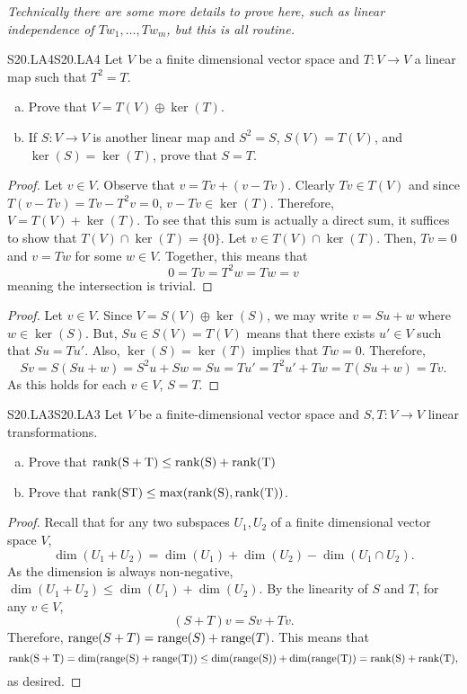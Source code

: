 \documentclass[../AlgebraQualSolutions.tex]{subfiles}
\begin{document}
	\emph{Technically there are some more details to prove here, such as linear independence of $Tw_1,\ldots, Tw_m$, but this is all routine.}

	\begin{prob}{S20.LA4}{S20.LA4}
		Let $V$ be a finite dimensional vector space and $T: V \to V$ a linear map such that $T^2 = T$.
		\begin{enumerate}[(a)]
			\item Prove that $V = T(V) \oplus \ker(T)$.
			\item If $S: V \to V$ is another linear map and $S^2 = S$, $S(V) = T(V)$, and $\ker(S) = \ker(T)$, prove that $S = T$.
		\end{enumerate}
	\end{prob}

	\begin{proof}
		Let $v \in V$. Observe that $v = Tv + (v - Tv)$. Clearly $Tv \in T(V)$ and since $T(v - Tv) = Tv - T^2v = 0$, $v - Tv \in \ker(T)$. Therefore, $V = T(V) + \ker(T)$. To see that this sum is actually a direct sum, it suffices to show that $T(V) \cap \ker(T) = \{0\}$. Let $v \in T(V) \cap \ker(T)$. Then, $Tv = 0$ and $v = Tw$ for some $w \in V$. Together, this means that
			\[0 = Tv = T^2w = Tw = v\]
		meaning the intersection is trivial.
	\end{proof}

	\begin{proof}
		Let $v \in V$. Since $V = S(V) \oplus \ker(S)$, we may write $v = Su + w$ where $w \in \ker(S)$. But, $Su \in S(V) = T(V)$ means that there exists $u' \in V$ such that $Su = Tu'$. Also, $\ker(S) = \ker(T)$ implies that $Tw = 0$. Therefore,
			\[Sv = S(Su + w) = S^2u + Sw = Su = Tu' = T^2u' + Tw = T(Su + w) = Tv.\]
		As this holds for each $v \in V$, $S = T$.
	\end{proof}

	\begin{prob}{S20.LA3}{S20.LA3}
		Let $V$ be a finite-dimensional vector space and $S,T: V \to V$ linear transformations.
		\begin{enumerate}[(a)]
			\item Prove that $\rm{rank}(S+T) \leq \rm{rank}(S) + \rm{rank}(T)$
			\item Prove that $\rm{rank}(ST) \leq \max(\rm{rank}(S), \rm{rank}(T))$.
		\end{enumerate}
	\end{prob}

	\begin{proof}
		Recall that for any two subspaces $U_1,U_2$ of a finite dimensional vector space $V$,
			\[\dim(U_1 + U_2) = \dim(U_1) + \dim(U_2) - \dim(U_1 \cap U_2).\]
		As the dimension is always non-negative, $\dim(U_1 + U_2) \leq \dim(U_1) + \dim(U_2)$. By the linearity of $S$ and $T$, for any $v \in V$,
			\[(S + T)v = Sv + Tv.\]
		Therefore, $\mathrm{range}(S + T) = \mathrm{range}(S) + \mathrm{range}(T)$. This means that
			\[\rm{rank}(S+T) = \dim(\mathrm{range}(S) + \mathrm{range}(T)) \leq \dim(\mathrm{range}(S)) + \dim(\mathrm{range}(T)) = \rm{rank}(S) + \rm{rank}(T),\]
		as desired.
	\end{proof}
\end{document}
